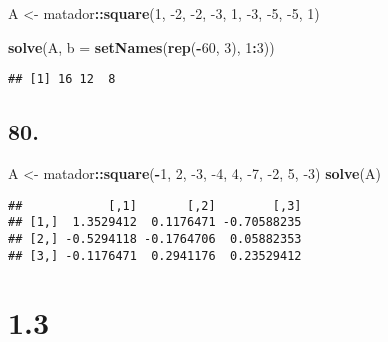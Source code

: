 \documentclass[]{article}
\newenvironment{Shaded}{\begin{snugshade}}{\end{snugshade}}
\newcommand{\DataTypeTok}[1]{\textcolor[rgb]{0.13,0.29,0.53}{#1}}
\newcommand{\DecValTok}[1]{\textcolor[rgb]{0.00,0.00,0.81}{#1}}
\newcommand{\KeywordTok}[1]{\textcolor[rgb]{0.13,0.29,0.53}{\textbf{#1}}}
\newcommand{\NormalTok}[1]{#1}
\newcommand{\OperatorTok}[1]{\textcolor[rgb]{0.81,0.36,0.00}{\textbf{#1}}}
\newcommand{\StringTok}[1]{\textcolor[rgb]{0.31,0.60,0.02}{#1}}
\begin{document}
\begin{Shaded}
\begin{Highlighting}[]
\NormalTok{A <-}\StringTok{ }\NormalTok{matador}\OperatorTok{::}\KeywordTok{square}\NormalTok{(}\DecValTok{1}\NormalTok{, }\DecValTok{-2}\NormalTok{, }\DecValTok{-2}\NormalTok{,}
                     \DecValTok{-3}\NormalTok{, }\DecValTok{1}\NormalTok{, }\DecValTok{-3}\NormalTok{,}
                     \DecValTok{-5}\NormalTok{, }\DecValTok{-5}\NormalTok{, }\DecValTok{1}\NormalTok{)}

\KeywordTok{solve}\NormalTok{(A, }\DataTypeTok{b =} \KeywordTok{setNames}\NormalTok{(}\KeywordTok{rep}\NormalTok{(}\OperatorTok{-}\DecValTok{60}\NormalTok{, }\DecValTok{3}\NormalTok{), }\DecValTok{1}\OperatorTok{:}\DecValTok{3}\NormalTok{))}
\end{Highlighting}
\end{Shaded}

\begin{verbatim}
## [1] 16 12  8
\end{verbatim}

\hypertarget{section-17}{%
\subsection{80.}\label{section-17}}

\begin{Shaded}
\begin{Highlighting}[]
\NormalTok{A <-}\StringTok{ }\NormalTok{matador}\OperatorTok{::}\KeywordTok{square}\NormalTok{(}\OperatorTok{-}\DecValTok{1}\NormalTok{, }\DecValTok{2}\NormalTok{, }\DecValTok{-3}\NormalTok{,}
                     \DecValTok{-4}\NormalTok{, }\DecValTok{4}\NormalTok{, }\DecValTok{-7}\NormalTok{,}
                     \DecValTok{-2}\NormalTok{, }\DecValTok{5}\NormalTok{, }\DecValTok{-3}\NormalTok{)}
\KeywordTok{solve}\NormalTok{(A)}
\end{Highlighting}
\end{Shaded}

\begin{verbatim}
##            [,1]       [,2]        [,3]
## [1,]  1.3529412  0.1176471 -0.70588235
## [2,] -0.5294118 -0.1764706  0.05882353
## [3,] -0.1176471  0.2941176  0.23529412
\end{verbatim}

\hypertarget{section-18}{%
\section{1.3}\label{section-18}}
\end{document}

